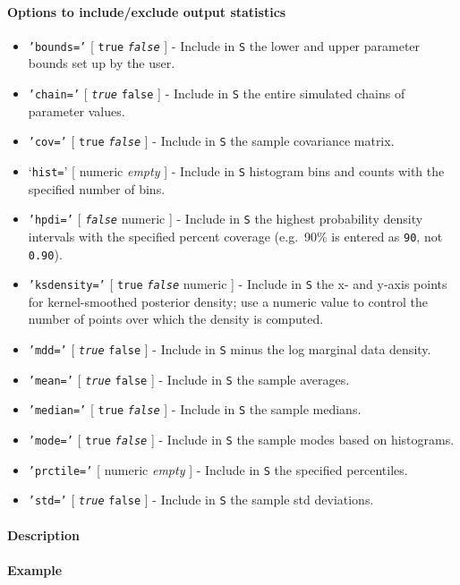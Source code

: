 \paragraph{Options to include/exclude output
statistics}

\begin{itemize}
\item
  \texttt{'bounds='} {[} \texttt{true} \textbar{} \emph{\texttt{false}}
  {]} - Include in \texttt{S} the lower and upper parameter bounds set
  up by the user.
\item
  \texttt{'chain='} {[} \emph{\texttt{true}} \textbar{} \texttt{false}
  {]} - Include in \texttt{S} the entire simulated chains of parameter
  values.
\item
  \texttt{'cov='} {[} \texttt{true} \textbar{} \emph{\texttt{false}} {]}
  - Include in \texttt{S} the sample covariance matrix.
\item
  `\texttt{hist=}' {[} numeric \textbar{} \emph{empty} {]} - Include in
  \texttt{S} histogram bins and counts with the specified number of
  bins.
\item
  \texttt{'hpdi='} {[} \emph{\texttt{false}} \textbar{} numeric {]} -
  Include in \texttt{S} the highest probability density intervals with
  the specified percent coverage (e.g.~90\% is entered as \texttt{90},
  not \texttt{0.90}).
\item
  \texttt{'ksdensity='} {[} \texttt{true} \textbar{}
  \emph{\texttt{false}} \textbar{} numeric {]} - Include in \texttt{S}
  the x- and y-axis points for kernel-smoothed posterior density; use a
  numeric value to control the number of points over which the density
  is computed.
\item
  \texttt{'mdd='} {[} \emph{\texttt{true}} \textbar{} \texttt{false} {]}
  - Include in \texttt{S} minus the log marginal data density.
\item
  \texttt{'mean='} {[} \emph{\texttt{true}} \textbar{} \texttt{false}
  {]} - Include in \texttt{S} the sample averages.
\item
  \texttt{'median='} {[} \texttt{true} \textbar{} \emph{\texttt{false}}
  {]} - Include in \texttt{S} the sample medians.
\item
  \texttt{'mode='} {[} \texttt{true} \textbar{} \emph{\texttt{false}}
  {]} - Include in \texttt{S} the sample modes based on histograms.
\item
  \texttt{'prctile='} {[} numeric \textbar{} \emph{empty} {]} - Include
  in \texttt{S} the specified percentiles.
\item
  \texttt{'std='} {[} \emph{\texttt{true}} \textbar{} \texttt{false} {]}
  - Include in \texttt{S} the sample std deviations.
\end{itemize}

\paragraph{Description}

\paragraph{Example}


